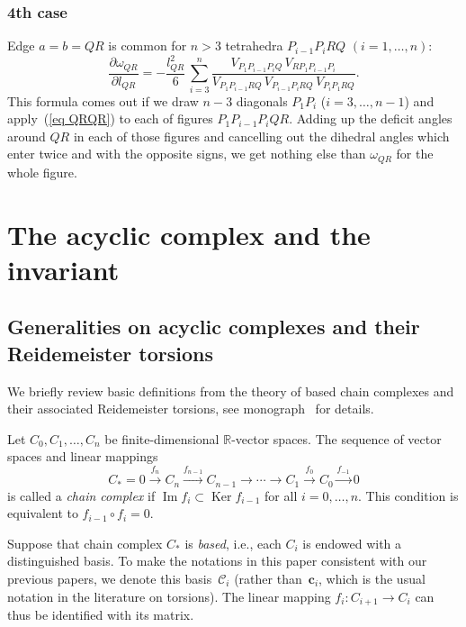 \documentclass[pdftex]{sigma}
\DeclareMathOperator{\Ima}{Im}
\DeclareMathOperator{\Ker}{Ker}
\begin{document}
\subsubsection*{4th case}
Edge $a=b=QR$ is common for $n > 3$ tetrahedra $P_{i-1}P_iRQ$ $(i = 1,\ldots,n)$:
\begin{equation}
\frac{\partial \omega_{QR}}{\partial l_{QR}} = -\frac {l_{QR}^2}{6}\, \sum\limits_{i=3}^n
\frac {V_{P_1P_{i-1}P_iQ}\,V_{RP_1P_{i-1}P_i}}{V_{P_1P_{i-1}RQ}\,V_{P_{i-1}P_iRQ}\,V_{P_iP_1RQ}}.
\label{eq QRQRn}
\end{equation}
This formula comes out if we draw $n-3$ diagonals $P_1P_i$ ($i = 3,\ldots,n-1$) and apply~(\ref{eq QRQR}) to each of f\/igures $P_1P_{i-1}P_iQR$. Adding up the def\/icit angles around $QR$ in each of those f\/igures and cancelling out the dihedral angles which enter twice and with the opposite signs, we get nothing else than $\omega_{QR}$ for the whole f\/igure.


\section{The acyclic complex and the invariant}
\label{sec_acyclic_general}

\subsection{Generalities on acyclic complexes and their Reidemeister torsions}

We brief\/ly review basic def\/initions from the theory of based chain complexes and their associated Reidemeister torsions, see monograph~\cite{Turaev:2001} for details.

\begin{definition}
\label{dfn:cmplx}
Let $C_0, C_1, \ldots , C_n$ be f\/inite-dimensional $\mathbb R$-vector spaces. The sequence of vector spaces and linear mappings
\begin{equation}
\label{eq:cmplx}
C_* = 0 \xrightarrow{f_n} C_n \xrightarrow{f_{n-1}} C_{n-1} \xrightarrow{} \cdots \xrightarrow{} C_1 \xrightarrow{f_0} C_0 \xrightarrow{f_{-1}} 0
\end{equation}
is called a \emph{chain complex} if $\Ima f_i \subset \Ker f_{i-1}$ for all $i = 0, \ldots, n$. This condition is equivalent to $f_{i-1} \circ f_i = 0$.
\end{definition}

Suppose that chain complex $C_*$ is \emph{based}, i.e., each $C_i$ is endowed with a distinguished basis. To make the notations in this paper consistent with our previous papers, we denote this basis~$\mathcal C_i$ (rather than~$\mathbf c_i$, which is the usual notation in the literature on torsions). The linear mapping $f_i \colon C_{i + 1} \to C_i$ can thus be identif\/ied with its matrix.
\end{document}
